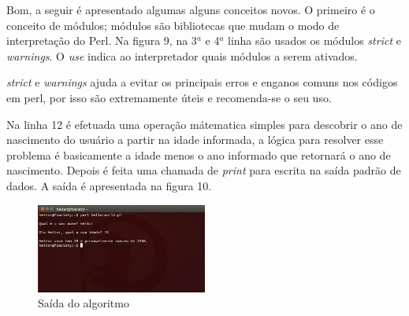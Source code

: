 Bom, a seguir \'e apresentado algumas alguns conceitos novos. O primeiro \'e o conceito de m\'odulos; m\'odulos s\~ao bibliotecas que mudam o modo de 
interpreta\c{c}\~ao do Perl. Na figura 9, na 3$^a$ e 4$^a$ linha s\~ao usados os m\'odulos \textit{strict} e \textit{warnings}. O \textit{use} 
indica ao interpretador quais m\'odulos a serem ativados.

\textit{strict} e \textit{warnings} ajuda a evitar os principais erros e enganos comuns nos c\'odigos em perl, por isso s\~ao extremamente \'uteis e 
recomenda-se o seu uso. 
  
Na linha 12 \'e efetuada uma opera\c{c}\~ao m\'atematica simples para descobrir o ano de nascimento do usu\'ario a partir na idade informada, a l\'ogica
para resolver esse problema \'e basicamente a idade menos o ano informado que retornar\'a o ano de nascimento. Depois \'e feita uma chamada de \textit{print}
para escrita na sa\'ida padr\~ao de dados. A sa\'ida \'e apresentada na figura 10.

\begin{figure}[!htb]
	\centering
	\includegraphics[width=0.5\textwidth]{../5_figuras/image10}
	\caption{Sa\'ida do algoritmo}
\end{figure}